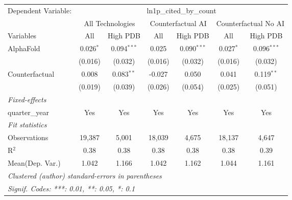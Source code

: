 \begingroup
\centering
\begin{tabular}{lcccccc}
   \tabularnewline \midrule \midrule
   Dependent Variable: & \multicolumn{6}{c}{ln1p\_cited\_by\_count}\\
 & \multicolumn{2}{c}{All Technologies} & \multicolumn{2}{c}{Counterfactual AI} & \multicolumn{2}{c}{Counterfactual No AI} \\
\cmidrule(lr){1-1}\cmidrule(lr){2-3} \cmidrule(lr){4-5} \cmidrule(lr){6-7}
Variables & \multicolumn{1}{c}{All} & \multicolumn{1}{c}{High PDB} & \multicolumn{1}{c}{All} & \multicolumn{1}{c}{High PDB} & \multicolumn{1}{c}{All} & \multicolumn{1}{c}{High PDB} \\
\cmidrule(lr){1-1}\cmidrule(lr){2-2} \cmidrule(lr){3-3} \cmidrule(lr){4-4} \cmidrule(lr){5-5} \cmidrule(lr){6-6} \cmidrule(lr){7-7}
   AlphaFold      & 0.026$^{*}$ & 0.094$^{***}$ & 0.025   & 0.090$^{***}$ & 0.027$^{*}$ & 0.096$^{***}$\\   
                  & (0.016)     & (0.032)       & (0.016) & (0.032)       & (0.016)     & (0.032)\\   
   Counterfactual & 0.008       & 0.083$^{**}$  & -0.027  & 0.050         & 0.041       & 0.119$^{**}$\\   
                  & (0.019)     & (0.039)       & (0.026) & (0.054)       & (0.025)     & (0.051)\\   
   \midrule
   \emph{Fixed-effects}\\
   quarter\_year  & Yes         & Yes           & Yes     & Yes           & Yes         & Yes\\  
   \midrule
   \emph{Fit statistics}\\
   Observations   & 19,387      & 5,001         & 18,039  & 4,675         & 18,137      & 4,647\\  
   R$^2$          & 0.38        & 0.38          & 0.38    & 0.38          & 0.38        & 0.39\\  
Mean(Dep. Var.) & 1.042 & 1.166 & 1.042 & 1.162 & 1.044 & 1.161 \\
   \midrule \midrule
   \multicolumn{7}{l}{\emph{Clustered (author) standard-errors in parentheses}}\\
   \multicolumn{7}{l}{\emph{Signif. Codes: ***: 0.01, **: 0.05, *: 0.1}}\\
\end{tabular}
\par\endgroup
